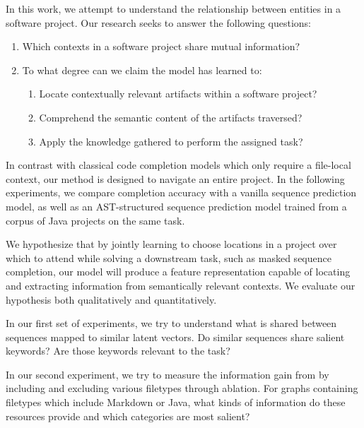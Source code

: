 \documentclass[11pt]{article}
\begin{document}
In this work, we attempt to understand the relationship between entities in a software project. Our research seeks to answer the following questions:

\begin{enumerate}
  \item Which contexts in a software project share mutual information?
  \item To what degree can we claim the model has learned to:\begin{enumerate}
  \item Locate contextually relevant artifacts within a software project?
  \item Comprehend the semantic content of the artifacts traversed?
  \item Apply the knowledge gathered to perform the assigned task?
  \end{enumerate}
\end{enumerate}

In contrast with classical code completion models which only require a file-local context, our method is designed to navigate an entire project. In the following experiments, we compare completion accuracy with a vanilla sequence prediction model, as well as an AST-structured sequence prediction model trained from a corpus of Java projects on the same task.

We hypothesize that by jointly learning to choose locations in a project over which to attend while solving a downstream task, such as masked sequence completion, our model will produce a feature representation capable of locating and extracting information from semantically relevant contexts. We evaluate our hypothesis both qualitatively and quantitatively.

In our first set of experiments, we try to understand what is shared between sequences mapped to similar latent vectors. Do similar sequences share salient keywords? Are those keywords relevant to the task?

In our second experiment, we try to measure the information gain from by including and excluding various filetypes through ablation. For graphs containing filetypes which include Markdown or Java, what kinds of information do these resources provide and which categories are most salient?

\end{document}
